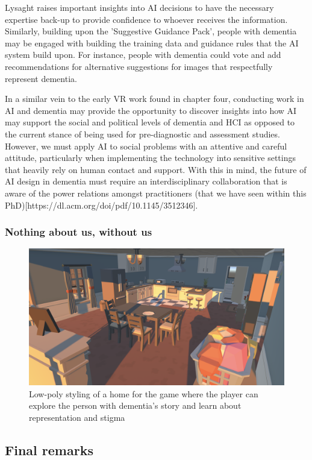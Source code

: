 Lysaght raises important insights into AI decisions to have the necessary expertise back-up to provide confidence to whoever receives the information. Similarly, building upon the 'Suggestive Guidance Pack', people with dementia may be engaged with building the training data and guidance rules that the AI system build upon. For instance, people with dementia could vote and add recommendations for alternative suggestions for images that respectfully represent dementia.

In a similar vein to the early VR work found in chapter four, conducting work in AI and dementia may provide the opportunity to discover insights into how AI may support the social and political levels of dementia and HCI as opposed to the current stance of being used for pre-diagnostic and assessment studies. However, we must apply AI to social problems with an attentive and careful attitude, particularly when implementing the technology into sensitive settings that heavily rely on human contact and support. With this in mind, the future of AI design in dementia must require an interdisciplinary collaboration that is aware of the power relations amongst practitioners (that we have seen within this PhD)[https://dl.acm.org/doi/pdf/10.1145/3512346].

\subsubsection{Nothing about us, without us}
\label{FutureStudyFour}
\begin{figure}[htp]
\centering
\includegraphics[width=1\linewidth]{Images/Discussion/Storytellling_Game.png}
\caption{Low-poly styling of a home for the game where the player can explore the person with dementia's story and learn about representation and stigma}
\label{fig:StorytellingLowPoly}
\end{figure}



\subsection{Final remarks}
\label{Discussion:FinalRemarks}